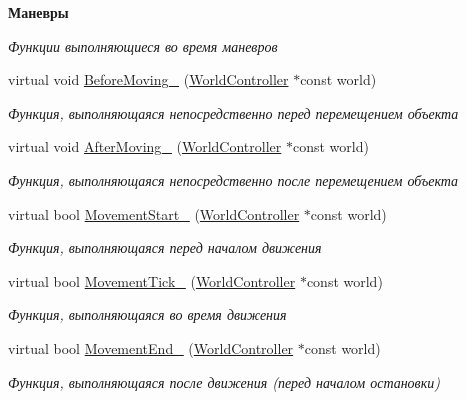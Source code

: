 \begin{Indent}\textbf{ Маневры}\par
{\em Функции выполняющиеся во время маневров }\begin{DoxyCompactItemize}
\item 
virtual void \hyperlink{classrtm_1_1_vehicle_object_abac2e84c7d102e9170843efd80c53fd2}{Before\+Moving\+\_\+} (\hyperlink{classrtm_1_1_world_controller}{World\+Controller} $\ast$const world)
\begin{DoxyCompactList}\small\item\em Функция, выполняющаяся непосредственно перед перемещением объекта \end{DoxyCompactList}\item 
virtual void \hyperlink{classrtm_1_1_vehicle_object_a4ffe184361efac31e9a009cfc4e07a1b}{After\+Moving\+\_\+} (\hyperlink{classrtm_1_1_world_controller}{World\+Controller} $\ast$const world)
\begin{DoxyCompactList}\small\item\em Функция, выполняющаяся непосредственно после перемещением объекта \end{DoxyCompactList}\item 
virtual bool \hyperlink{classrtm_1_1_vehicle_object_aa02e0b8f3fa159939f370938e45abf88}{Movement\+Start\+\_\+} (\hyperlink{classrtm_1_1_world_controller}{World\+Controller} $\ast$const world)
\begin{DoxyCompactList}\small\item\em Функция, выполняющаяся перед началом движения \end{DoxyCompactList}\item 
virtual bool \hyperlink{classrtm_1_1_vehicle_object_a06a920b3fe0df4fa4ca0687a9366426a}{Movement\+Tick\+\_\+} (\hyperlink{classrtm_1_1_world_controller}{World\+Controller} $\ast$const world)
\begin{DoxyCompactList}\small\item\em Функция, выполняющаяся во время движения \end{DoxyCompactList}\item 
virtual bool \hyperlink{classrtm_1_1_vehicle_object_a7e6c94902d1d544006ca8de63ba36860}{Movement\+End\+\_\+} (\hyperlink{classrtm_1_1_world_controller}{World\+Controller} $\ast$const world)
\begin{DoxyCompactList}\small\item\em Функция, выполняющаяся после движения (перед началом остановки) \end{DoxyCompactList}\item 

\end{DoxyCompactItemize}
\end{Indent}
